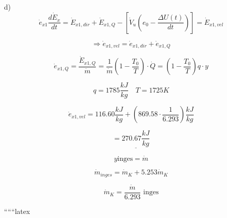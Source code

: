d) 
\[
\dot{e}_{x1} \frac{d \dot{E}_x}{dt} = \dot{E}_{x1,dir} + \dot{E}_{x1,Q} - \left[ \dot{V}_u \left( e_0 - \frac{\Delta U(t)}{dt} \right) \right] = \dot{E}_{x1,vel}
\]

\[
\Rightarrow \dot{e}_{x1,vel} = \dot{e}_{x1,dir} + \dot{e}_{x1,Q}
\]

\[
\dot{e}_{x1,Q} = \frac{\dot{E}_{x1,Q}}{\dot{m}} = \frac{1}{\dot{m}} \left( 1 - \frac{T_0}{T} \right) \cdot \dot{Q} = \left( 1 - \frac{T_0}{T} \right) q \cdot y
\]

\[
q = 1785 \frac{kJ}{kg} \quad T = 1725 K
\]

\[
\dot{e}_{x1,vel} = 116.60 \frac{kJ}{kg} + \left( 869.58 \cdot \frac{1}{6.293} \right) \frac{kJ}{kg}
\]

\[
= \underline{270.67 \frac{kJ}{kg}}
\]

\[
y \text{inges} = \dot{m}
\]

\[
\dot{m}_{inges} = \dot{m}_K + 5.253 \dot{m}_K
\]

\[
\dot{m}_K = \frac{\dot{m}}{6.293} \text{ inges}
\]

``````latex